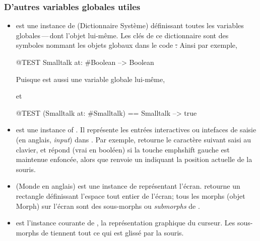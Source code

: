 \documentclass[a4paper,10pt,twoside]{book}
\begin{document}

\subsubsection{D'autres variables globales utiles}

\begin{itemize}
\item
{} est une instance de  (Dictionnaire Syst\`eme) d\'efinissant toutes les variables globales\,---\,dont l'objet  lui-m\^eme.   
Les cl\'es de ce dictionnaire sont des symboles nommant les objets globaux dans le code \st.
Ainsi par exemple,
\begin{code}{@TEST}
Smalltalk at: #Boolean --> Boolean
\end{code}
Puisque  est aussi une variable globale lui-m\^eme,
\begin{code}{}
Smalltalk at: #Smalltalk-->a SystemDictionary(lots of globals)}
\end{code} 
et
\begin{code}{@TEST}
(Smalltalk at: #Smalltalk) == Smalltalk --> true
\end{code}

\item {} est une instance of . Il repr\'esente les entr\'ees interactives ou intefaces de saisie (en anglais, \emph{input}) dans \squeak.
Par exemple,  retourne le caract\`ere suivant saisi au clavier, et  r\'epond  (vrai en bool\'een) si la
touche emph{shift} gauche est maintenue enfonc\'ee, alors que  renvoie un  indiquant la position actuelle de la souris.

\item {} (Monde en anglais) est une instance de  repr\'esentant l'\'ecran.
 retourne un rectangle d\'efinissant l'espace tout entier de l'\'ecran; tous les morphs (objet Morph) sur l'\'ecran sont des sous-morphs ou \emph{submorphs} de .

\item {} est l'instance courante de , la repr\'esentation graphique du curseur. Les sous-morphs de  tiennent tout ce qui est gliss\'e par la souris.


\end{itemize}
\end{document}
